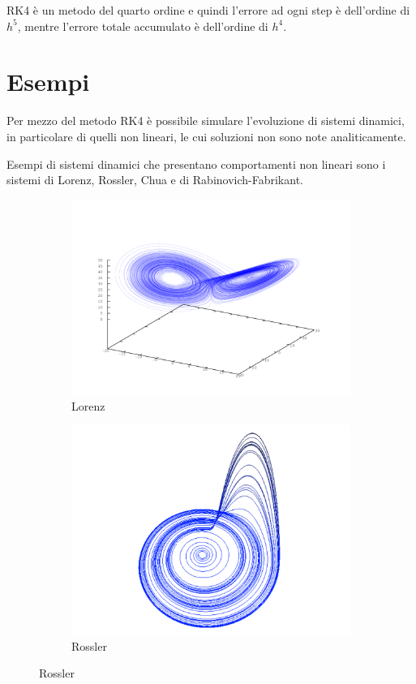 RK4 è un metodo del quarto ordine e quindi l'errore ad ogni step è dell'ordine di $h^5$, mentre l'errore totale accumulato è dell'ordine di $h^4$.

\section{Esempi}
Per mezzo del metodo RK4 è possibile simulare l'evoluzione di sistemi dinamici, in particolare di quelli non lineari, le cui soluzioni non sono note analiticamente.

Esempi di sistemi dinamici che presentano comportamenti non lineari sono i sistemi di Lorenz, Rossler, Chua e di Rabinovich-Fabrikant.

\begin{figure}[H]
 \begin{subfigure}[b]{0.5\textwidth}
  \centering
  \includegraphics[width=\textwidth]{lorenz}
  \caption{Lorenz}
  \label{fig:lorenz}
 \end{subfigure}
 \begin{subfigure}[b]{0.5\textwidth}
  \centering
  \includegraphics[width=\textwidth]{rossler}
  \caption{Rossler}
  \label{fig:rossler}
 \end{subfigure}


\end{figure}
